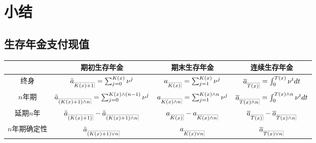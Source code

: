 \documentclass[lang=cn,10pt]{elegantbook}
\makeatletter
\DeclareRobustCommand{\annu}[1]{_{%
    \def\arraystretch{0}%
    \setlength\arraycolsep{1pt}%
    \setlength\arrayrulewidth{.2pt}%
    \begin{array}[b]{@{}c|}\hline
        \\[\arraycolsep]%
        \scriptstyle #1%
    \end{array}%
}}
\makeatother
\begin{document}
\section{小结}
\subsection{生存年金支付现值}
\begin{center}
    \begin{tabular}{c|c|c|c}
        \hline
        & 期初生存年金 & 期末生存年金 & 连续生存年金 \\
        \hline
        终身 & $\ddot a_{\annu{K(x)+1}} = \sum_{j=0}^{K(x)}{\nu^j}$ & $a_{\annu{K(x)}} = \sum_{j=1}^{K(x)}{\nu^j}$ & $\overline{a}_{\annu{T(x)}}=\int_0^{T(x)} \nu^tdt$ \\
        \hline
        $n$年期 & $\ddot a_{\annu{(K(x)+1)\land n}} = \sum_{j=0}^{K(x)\land (n-1)}{\nu^j}$ & $a_{\annu{K(x)\land n}} = \sum_{j=1}^{K(x)\land n}{\nu^j}$ & $  \overline{a}_{\annu{T(x)\land n}}=\int_0^{T(x)\land n} \nu^tdt$ \\
        \hline
        延期$n$年 & $\ddot a_{\annu{(K(x)+1)}} - \ddot a_{\annu{(K(x)+1)\land n}}$ & $a_{\annu{K(x)}} - a_{\annu{K(x)\land n}}$ & $\overline{a}_{\annu{T(x)}} - \overline{a}_{\annu{T(x)\land n}}$  \\
        \hline
        $n$年期确定性 & $\ddot a_{\annu{(K(x)+1)\lor n}}$ & $a_{\annu{K(x)\lor n}}$ & $\overline{a}_{\annu{T(x)\lor n}}$  \\  
        \hline
    \end{tabular}
\end{center}
\end{document}
